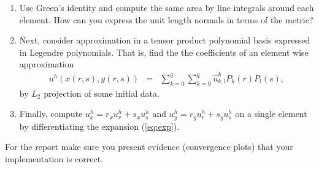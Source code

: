\documentclass[11pt]{article}
\begin{document}
\begin{enumerate}
\item Use Green's identity and compute the same area by line integrals around each element. How can you express the unit length normals in terms of the metric? 

\item Next, consider approximation in a tensor product polynomial basis expressed in Legendre polynomials. That is, find the the coefficients of an element wise approximation  
\begin{eqnarray}
u^h(x(r,s),y(r,s)) &=& \sum_{k = 0}^{q} \sum_{k = 0}^{q} \hat{u}^h_{k,l} P_k(r) P_l(s), \label{eq:exp} 
\end{eqnarray} 
by $L_2$ projection of some initial data. 

\item Finally, compute $u^h_x = r_x u^h_r + s_x u_s^h$ and  $u^h_y = r_y u^h_r + s_y u_s^h$ on a single element by differentiating the expansion (\ref{eq:exp}). 
\end{enumerate}

For the report make sure you present evidence (convergence plots) that your implementation is correct. 
\end{document}
